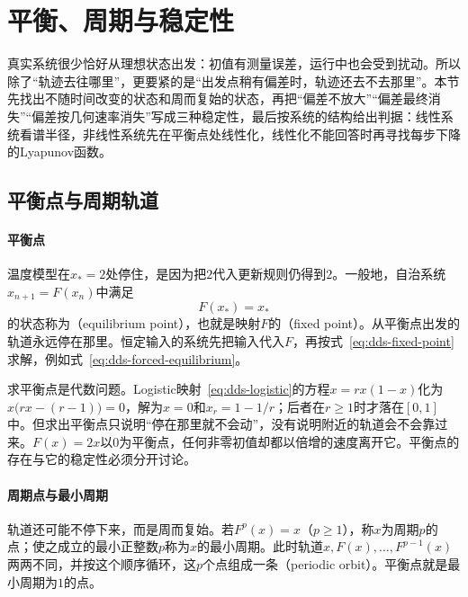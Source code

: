 
\section{平衡、周期与稳定性}
\label{sec:dds-equilibria-stability}
\label{sec:dynamical-stability-sensitivity}

真实系统很少恰好从理想状态出发：初值有测量误差，运行中也会受到扰动。所以除了“轨迹去往哪里”，更要紧的是“出发点稍有偏差时，轨迹还去不去那里”。本节先找出不随时间改变的状态和周而复始的状态，再把“偏差不放大”“偏差最终消失”“偏差按几何速率消失”写成三种稳定性，最后按系统的结构给出判据：线性系统看谱半径，非线性系统先在平衡点处线性化，线性化不能回答时再寻找每步下降的Lyapunov函数。

\subsection{平衡点与周期轨道}
\label{sec:dds-equilibria-periodic}

\paragraph{平衡点}
温度模型在$x_*=2$处停住，是因为把$2$代入更新规则仍得到$2$。一般地，自治系统$x_{n+1}=F(x_n)$中满足
\begin{equation}
  F(x_*)=x_*
  \label{eq:dds-fixed-point}
\end{equation}
的状态称为（equilibrium point），也就是映射$F$的（fixed point）。从平衡点出发的轨道永远停在那里。恒定输入的系统先把输入代入$F$，再按式~\eqref{eq:dds-fixed-point}求解，例如式~\eqref{eq:dds-forced-equilibrium}。

求平衡点是代数问题。Logistic映射~\eqref{eq:dds-logistic}的方程$x=rx(1-x)$化为$x\bigl(rx-(r-1)\bigr)=0$，解为$x=0$和$x_r=1-1/r$；后者在$r\geq1$时才落在$[0,1]$中。但求出平衡点只说明“停在那里就不会动”，没有说明附近的轨道会不会靠过来。$F(x)=2x$以$0$为平衡点，任何非零初值却都以倍增的速度离开它。平衡点的存在与它的稳定性必须分开讨论。

\paragraph{周期点与最小周期}
轨道还可能不停下来，而是周而复始。若$F^p(x)=x$（$p\geq1$），称$x$为周期$p$的点；使之成立的最小正整数$p$称为$x$的最小周期。此时轨道$x,F(x),\ldots,F^{p-1}(x)$两两不同，并按这个顺序循环，这$p$个点组成一条（periodic orbit）。平衡点就是最小周期为$1$的点。

